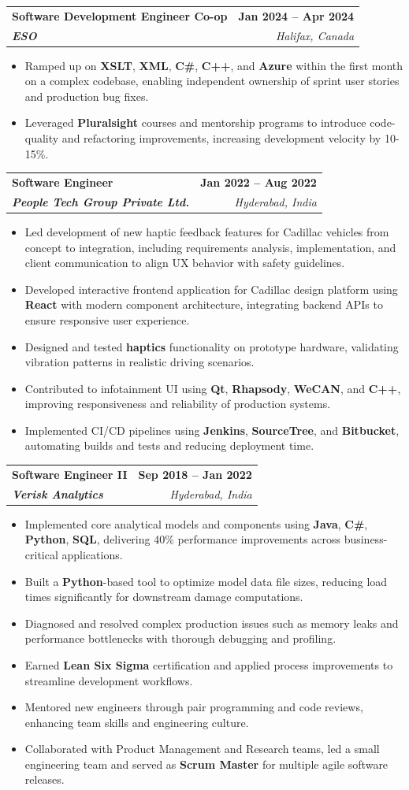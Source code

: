 \documentclass[letterpaper,11pt]{article}
\makeatletter
\newcommand{\resumeItem}[1]{
  \item\small{
    {#1 \vspace{-2pt}}
  }
}
\newcommand{\resumeSubheading}[4]{
  \vspace{-2pt}\item
    \begin{tabular*}{1.0\textwidth}[t]{l@{\extracolsep{\fill}}r}
      \textbf{#1} & \textbf{\small #2} \\
      \textit{\small#3} & \textit{\small #4} \\
    \end{tabular*}\vspace{-7pt}
}
\newcommand{\resumeItemListStart}{\begin{itemize}}
\newcommand{\resumeItemListEnd}{\end{itemize}\vspace{-5pt}}
\makeatother
\begin{document}
    \resumeSubheading
      {\textbf{Software Development Engineer Co-op}}{\textbf{Jan 2024 -- Apr 2024}}
      {\textbf{ESO}}{Halifax, Canada}
      \resumeItemListStart
        \resumeItem{Ramped up on \textbf{XSLT}, \textbf{XML}, \textbf{C\#}, \textbf{C++}, and \textbf{Azure} within the first month on a complex codebase, enabling independent ownership of sprint user stories and production bug fixes.}
        \resumeItem{Leveraged \textbf{Pluralsight} courses and mentorship programs to introduce code-quality and refactoring improvements, increasing development velocity by 10-15\%.}
      \resumeItemListEnd

    \resumeSubheading
      {\textbf{Software Engineer}}{\textbf{Jan 2022 -- Aug 2022}}
      {\textbf{People Tech Group Private Ltd.}}{Hyderabad, India}
      \resumeItemListStart
        \resumeItem{Led development of new haptic feedback features for Cadillac vehicles from concept to integration, including requirements analysis, implementation, and client communication to align UX behavior with safety guidelines.}
        \resumeItem{Developed interactive frontend application for Cadillac design platform using \textbf{React} with modern component architecture, integrating backend APIs to ensure responsive user experience.}
        \resumeItem{Designed and tested \textbf{haptics} functionality on prototype hardware, validating vibration patterns in realistic driving scenarios.}
        \resumeItem{Contributed to infotainment UI using \textbf{Qt}, \textbf{Rhapsody}, \textbf{WeCAN}, and \textbf{C++}, improving responsiveness and reliability of production systems.}
        \resumeItem{Implemented CI/CD pipelines using \textbf{Jenkins}, \textbf{SourceTree}, and \textbf{Bitbucket}, automating builds and tests and reducing deployment time.}
      \resumeItemListEnd

    \resumeSubheading
      {\textbf{Software Engineer II}}{\textbf{Sep 2018 -- Jan 2022}}
      {\textbf{Verisk Analytics}}{Hyderabad, India}
      \resumeItemListStart
        \resumeItem{Implemented core analytical models and components using \textbf{Java}, \textbf{C\#}, \textbf{Python}, \textbf{SQL}, delivering 40\% performance improvements across business-critical applications.}
        \resumeItem{Built a \textbf{Python}-based tool to optimize model data file sizes, reducing load times significantly for downstream damage computations.}
        \resumeItem{Diagnosed and resolved complex production issues such as memory leaks and performance bottlenecks with thorough debugging and profiling.}
        \resumeItem{Earned \textbf{Lean Six Sigma} certification and applied process improvements to streamline development workflows.}
        \resumeItem{Mentored new engineers through pair programming and code reviews, enhancing team skills and engineering culture.}
        \resumeItem{Collaborated with Product Management and Research teams, led a small engineering team and served as \textbf{Scrum Master} for multiple agile software releases.}
      \resumeItemListEnd
\end{document}
